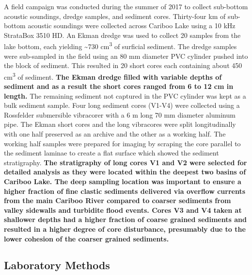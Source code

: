 \documentclass[Royal,times,doublespace,sageh]{sagej}
\begin{document}
A field campaign was conducted during the summer of 2017 to collect
sub-bottom acoustic soundings, dredge samples, and sediment cores.
Thirty-four km of sub-bottom acoustic soundings were collected across
Cariboo Lake using a 10 kHz StrataBox 3510 HD. An Ekman dredge was used
to collect 20 samples from the lake bottom, each yielding
\textasciitilde730 cm\textsuperscript{3} of surficial sediment. The
dredge samples were sub-sampled in the field using an 80 mm diameter PVC
cylinder pushed into the block of sediment. This resulted in 20 short
cores each containing about 450 cm\textsuperscript{3} of sediment.
\textbf{The Ekman dredge filled with variable depths of sediment and as
a result the short cores ranged from 6 to 12 cm in length.} The
remaining sediment not captured in the PVC cylinder was kept as a bulk
sediment sample. Four long sediment cores (V1-V4) were collected using a
Rossfelder submersible vibracorer with a 6 m long 70 mm diameter
aluminum pipe. The Ekman short cores and the long vibracores were split
longitudinally with one half preserved as an archive and the other as a
working half. The working half samples were prepared for imaging by
scraping the core parallel to the sediment laminae to create a flat
surface which showed the sediment stratigraphy. \textbf{The stratigraphy
of long cores V1 and V2 were selected for detailed analysis as they were
located within the deepest two basins of Cariboo Lake. The deep sampling
location was important to ensure a higher fraction of fine clastic
sediments delivered via overflow currents from the main Cariboo River
compared to coarser sediments from valley sidewalls and turbidite flood
events. Cores V3 and V4 taken at shallower depths had a higher fraction
of coarse grained sediments and resulted in a higher degree of core
disturbance, presumably due to the lower cohesion of the coarser grained
sediments.}

\hypertarget{laboratory-methods}{%
\subsection{Laboratory Methods}\label{laboratory-methods}}
\end{document}
